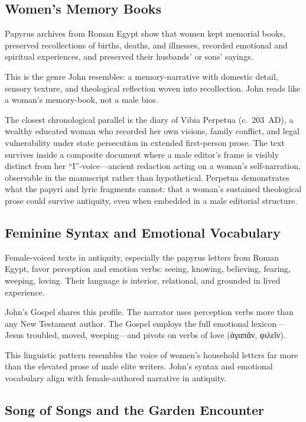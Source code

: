 \subsection{Women's Memory Books}\label{subsec:womens-memory-books}

Papyrus archives from Roman Egypt show that women kept memorial books, preserved recollections of births, deaths, and illnesses, recorded emotional and spiritual experiences, and preserved their husbands' or sons' sayings.

This is the genre John resembles: a memory-narrative with domestic detail, sensory texture, and theological reflection woven into recollection.
John reads like a woman's memory-book, not a male bios.

The closest chronological parallel is the diary of Vibia Perpetua (c.~203~AD), a wealthy educated woman who recorded her own visions, family conflict, and legal vulnerability under state persecution in extended first-person prose.
The text survives inside a composite document where a male editor's frame is visibly distinct from her ``I''-voice---ancient redaction acting on a woman's self-narration, observable in the manuscript rather than hypothetical.
Perpetua demonstrates what the papyri and lyric fragments cannot: that a woman's sustained theological prose could survive antiquity, even when embedded in a male editorial structure.

\subsection{Feminine Syntax and Emotional Vocabulary}\label{subsec:feminine-syntax}

Female-voiced texts in antiquity, especially the papyrus letters from Roman Egypt, favor perception and emotion verbs: seeing, knowing, believing, fearing, weeping, loving.
Their language is interior, relational, and grounded in lived experience.

John's Gospel shares this profile.
The narrator uses perception verbs more than any New Testament author.
The Gospel employs the full emotional lexicon---Jesus troubled, moved, weeping---and pivots on verbs of love (ἀγαπᾶν, φιλεῖν).

This linguistic pattern resembles the voice of women's household letters far more than the elevated prose of male elite writers.
John's syntax and emotional vocabulary align with female-authored narrative in antiquity.

\subsection{Song of Songs and the Garden Encounter}\label{subsec:song-of-songs}

